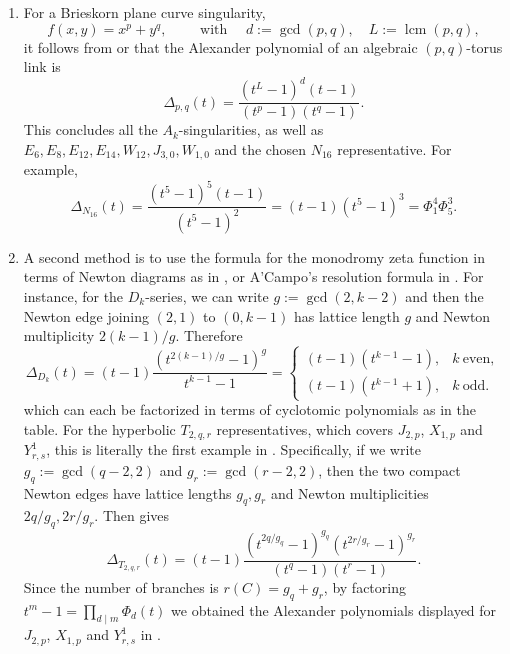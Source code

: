 \begin{enumerate}[label=$(\alph*)$]
    \item For a Brieskorn plane curve singularity, 
\[
f(x,y)=x^p+y^q,\qquad\mbox{ with }\quad d:=\gcd(p,q),\quad L:=\operatorname{lcm}(p,q),
\]
it follows from \cite[Section 3]{MilnorOrlik1970} or \cite[Theorem~6.4(a)]{HertlingMase2022} that the Alexander polynomial of an algebraic $(p,q)$-torus link is
\begin{equation}\label{eq:Brieskorn}
\Delta_{p,q}(t)
=
\frac{(t^L-1)^d(t-1)}
{(t^p-1)(t^q-1)}.
\end{equation}
This concludes all the $A_k$-singularities, as well as $E_6,E_8,E_{12},E_{14},W_{12},J_{3,0},W_{1,0}$ and the chosen $N_{16}$ representative. For example,
\[
\Delta_{N_{16}}(t)
=
\frac{(t^5-1)^5(t-1)}{(t^5-1)^2}
=(t-1)(t^5-1)^3
=\Phi_1^4\Phi_5^3.
\]

  \item A second method is to use the formula for the monodromy zeta function in terms of Newton diagrams as in \cite[Theorem 4.1]{Varchenko1976}, or A'Campo's resolution formula in \cite{ACampo1975}. For instance, for the $D_k$-series, we can write $g:=\gcd(2,k-2)$ and then the Newton edge joining $(2,1)$ to $(0,k-1)$ has lattice length $g$ and Newton multiplicity $2(k-1)/g$. Therefore
  \begin{equation}\label{eq:D}
\Delta_{D_k}(t)
=(t-1)\frac{(t^{2(k-1)/g}-1)^g}{t^{k-1}-1}
=
\begin{cases}
(t-1)(t^{k-1}-1),& k\ \text{even},\\[1mm]
(t-1)(t^{k-1}+1),& k\ \text{odd}.
\end{cases}
\end{equation}
which can each be factorized in terms of cyclotomic polynomials as in the table. For the hyperbolic $T_{2,q,r}$ representatives, which covers $J_{2,p}$, $X_{1,p}$ and $Y^1_{r,s}$, this is literally the first example in \cite{Varchenko1976}. Specifically, if we write $g_q:=\gcd(q-2,2)$ and $g_r:=\gcd(r-2,2)$, then the two compact Newton edges have lattice lengths $g_q,g_r$ and Newton multiplicities $2q/g_q,2r/g_r$. Then \cite[Theorem 4.1]{Varchenko1976} gives
\begin{equation}\label{eq:T}
\Delta_{T_{2,q,r}}(t)
=
(t-1)
\frac{
(t^{2q/g_q}-1)^{g_q}
(t^{2r/g_r}-1)^{g_r}
}
{(t^q-1)(t^r-1)}.
\end{equation}
Since the number of branches is $r(C)=g_q+g_r$, by factoring $t^m-1=\prod_{d\mid m}\Phi_d(t)$ we obtained the Alexander polynomials displayed for $J_{2,p}$, $X_{1,p}$ and $Y^1_{r,s}$ in .\\


\end{enumerate}
